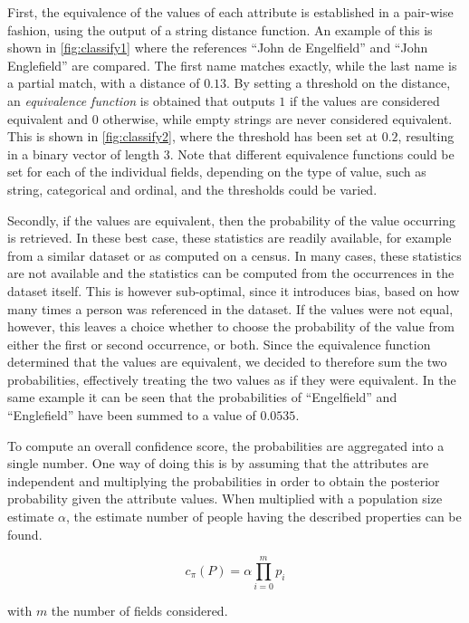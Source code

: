 First, the equivalence of the values of each attribute is established in a pair-wise fashion, using the output of a string distance function.
An example of this is shown in \cref{fig:classify1} where the references ``John de Engelfield'' and ``John Englefield'' are compared.
The first name matches exactly, while the last name is a partial match, with a distance of $0.13$.
By setting a threshold on the distance, an \emph{equivalence function} is obtained that outputs $1$ if the values are considered equivalent and $0$ otherwise, while empty strings are never considered equivalent.
This is shown in \cref{fig:classify2}, where the threshold has been set at $0.2$, resulting in a binary vector of length $3$.
Note that different equivalence functions could be set for each of the individual fields, depending on the type of value, such as string, categorical and ordinal, and the thresholds could be varied.

Secondly, if the values are equivalent, then the probability of the value occurring is retrieved.
In these best case, these statistics are readily available, for example from a similar dataset or as computed on a census.
In many cases, these statistics are not available and the statistics can be computed from the occurrences in the dataset itself.
This is however sub-optimal, since it introduces bias, based on how many times a person was referenced in the dataset.
If the values were not equal, however, this leaves a choice whether to choose the probability of the value from either the first or second occurrence, or both.
Since the equivalence function determined that the values are equivalent, we decided to therefore sum the two probabilities, effectively treating the two values as if they were equivalent.
In the same example it can be seen that the probabilities of ``Engelfield'' and ``Englefield'' have been summed to a value of $0.0535$.

To compute an overall confidence score, the probabilities are aggregated into a single number.
One way of doing this is by assuming that the attributes are independent and multiplying the probabilities in order to obtain the posterior probability given the attribute values.
When multiplied with a population size estimate $\alpha$, the estimate number of people having the described properties can be found.

\begin{equation}
    c_{\pi}(P) = \alpha \prod_{i=0}^{m} p_i
\end{equation}

\noindent with $m$ the number of fields considered.

